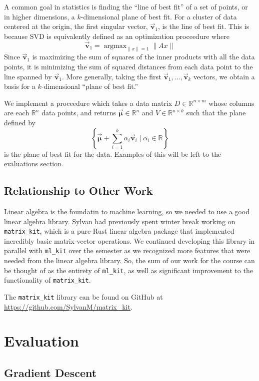 \documentclass[12pt, letterpaper]{article}
\theoremstyle{definition}
\theoremstyle{remark}
\newcommand{\vect}[1]{\vec{\mathbf{#1}}}
\newcommand{\R}{\mathbb{R}}
\DeclareMathOperator*{\argmax}{argmax}
\begin{document}
A common goal in statistics is finding the ``line of best fit'' of a set of points, or in higher dimensions,
a $k$-dimensional plane of best fit. For a cluster of data centered at the origin, the first singular vector, $\vect v_1$,
is the line of best fit. This is because SVD is equivalently defined as an optimization proceedure where 
\[
    \vect v_1 = \argmax_{\|x\| = 1} \|Ax\|
\]
Since $\vect v_1$ is maximizing the sum of squares of the inner products with all the data points, it is minimizing 
the sum of squared distances from each data point to the line spanned by $\vect v_1$. More generally, taking the first 
$\vect v_1, \ldots, \vect v_k$ vectors, we obtain a basis for a $k$-dimensional ``plane of best fit.'' 

We implement a proceedure which takes a data matrix $D \in \R^{n \times m}$ whose columns are each $\R^n$ data points, 
and returns $\vect \mu \in \R^n$ and $V \in \R^{n \times k}$ such that the plane defined by 
\[
    \left\{\vect \mu + \sum_{i = 1}^{k} \alpha_i \vect v_i \mid \alpha_i \in \R\right\}
\]
is the plane of best fit for the data. Examples of this will be left to the evaluations section.

\subsection{Relationship to Other Work}

Linear algebra is the foundatin to machine learning, so we needed to use a good linear algebra library. Sylvan had 
previously spent winter break working on \texttt{matrix\_kit}, which is a pure-Rust linear algebra package that 
implemented incredibly basic matrix-vector operations. We continued developing this library in parallel with 
\texttt{ml\_kit} over the semester as we recognized more features that were needed from the linear algebra library. 
So, the sum of our work for the course can be thought of as the entirety of \texttt{ml\_kit}, as well as significant
improvement to the functionality of \texttt{matrix\_kit}.

The \texttt{matrix\_kit} library can be found on GitHub at \url{https://github.com/SylvanM/matrix_kit}.

\section{Evaluation}

\subsection{Gradient Descent}
\end{document}
